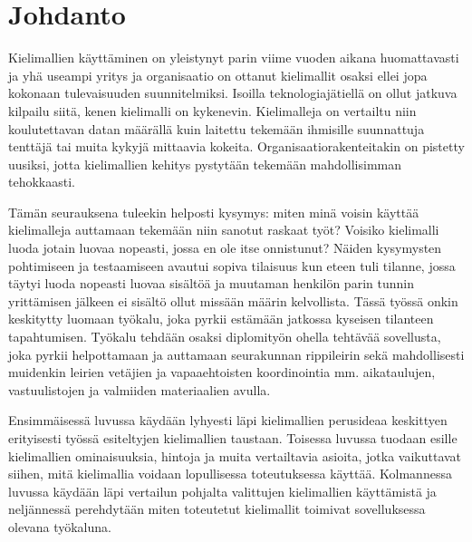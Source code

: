 \chapter{Johdanto}
\label{ch:johdanto}

Kielimallien käyttäminen on yleistynyt parin viime vuoden aikana huomattavasti
ja yhä useampi yritys ja organisaatio on ottanut kielimallit osaksi ellei jopa
kokonaan tulevaisuuden suunnitelmiksi. Isoilla teknologiajätiellä on ollut
jatkuva kilpailu siitä, kenen kielimalli on kykenevin. Kielimalleja on
vertailtu niin koulutettavan datan määrällä kuin laitettu tekemään ihmisille
suunnattuja tenttäjä tai muita kykyjä mittaavia kokeita.
Organisaatiorakenteitakin on pistetty uusiksi, jotta kielimallien kehitys
pystytään tekemään mahdollisimman tehokkaasti.

Tämän seurauksena tuleekin helposti kysymys: miten minä voisin käyttää
kielimalleja auttamaan tekemään niin sanotut raskaat työt? Voisiko kielimalli
luoda jotain luovaa nopeasti, jossa en ole itse onnistunut? Näiden kysymysten
pohtimiseen ja testaamiseen avautui sopiva tilaisuus kun eteen tuli tilanne,
jossa täytyi luoda nopeasti luovaa sisältöä ja muutaman henkilön parin tunnin
yrittämisen jälkeen ei sisältö ollut missään määrin kelvollista. Tässä työssä
onkin keskitytty luomaan työkalu, joka pyrkii estämään jatkossa kyseisen
tilanteen tapahtumisen. Työkalu tehdään osaksi diplomityön ohella tehtävää
sovellusta, joka pyrkii helpottamaan ja auttamaan seurakunnan rippileirin sekä
mahdollisesti muidenkin leirien vetäjien ja vapaaehtoisten koordinointia mm.
aikataulujen, vastuulistojen ja valmiiden materiaalien avulla.

Ensimmäisessä luvussa käydään lyhyesti läpi kielimallien perusideaa keskittyen
erityisesti työssä esiteltyjen kielimallien taustaan. Toisessa luvussa
tuodaan esille kielimallien ominaisuuksia, hintoja ja muita vertailtavia
asioita, jotka vaikuttavat siihen, mitä kielimallia voidaan lopullisessa
toteutuksessa käyttää. Kolmannessa luvussa käydään läpi vertailun pohjalta
valittujen kielimallien käyttämistä ja neljännessä perehdytään miten toteutetut
kielimallit toimivat sovelluksessa olevana työkaluna.
